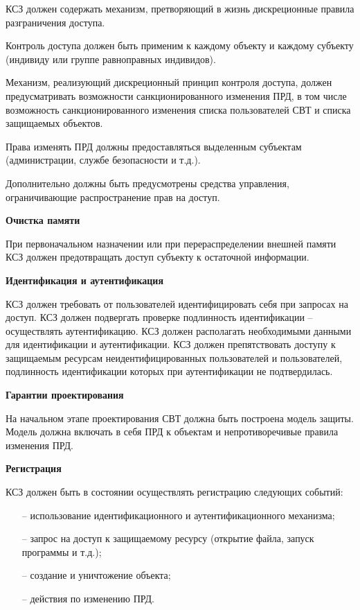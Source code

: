 КСЗ должен содержать механизм, претворяющий в жизнь дискреционные
правила разграничения доступа.

Контроль доступа должен быть применим к каждому объекту и каждому
субъекту (индивиду или группе равноправных индивидов).

Механизм, реализующий дискреционный принцип контроля доступа,
должен предусматривать возможности санкционированного изменения ПРД,
в том числе возможность санкционированного изменения списка
пользователей СВТ и списка защищаемых объектов.

Права изменять ПРД должны предоставляться выделенным субъектам
(администрации, службе безопасности и т.д.).

Дополнительно должны быть предусмотрены средства управления,
ограничивающие распространение прав на доступ.

\textbf{Очистка памяти}

При первоначальном назначении или при перераспределении внешней
памяти КСЗ должен предотвращать доступ субъекту к остаточной
информации.

\textbf{Идентификация и аутентификация}

КСЗ должен требовать от пользователей идентифицировать себя при
запросах на доступ. КСЗ должен подвергать проверке подлинность
идентификации – осуществлять аутентификацию. КСЗ должен располагать
необходимыми данными для идентификации и аутентификации. КСЗ должен
препятствовать доступу к защищаемым ресурсам неидентифицированных
пользователей и пользователей, подлинность идентификации которых при
аутентификации не подтвердилась.

\textbf{Гарантии проектирования}

На начальном этапе проектирования СВТ должна быть построена модель
защиты. Модель должна включать в себя ПРД к объектам и
непротиворечивые правила изменения ПРД.

\textbf{Регистрация}

КСЗ должен быть в состоянии осуществлять регистрацию следующих
событий:
\begin{itemize}
  \item [--] использование идентификационного и аутентификационного механизма;
  \item [--] запрос на доступ к защищаемому ресурсу (открытие файла, запуск
  программы и т.д.);
  \item [--] создание и уничтожение объекта;
  \item [--] действия по изменению ПРД.
\end{itemize}

